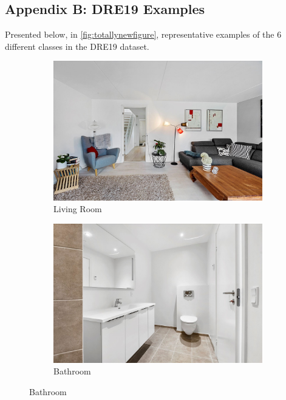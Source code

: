 \subsection*{Appendix B: DRE19 Examples}\label{appendix: B}
Presented below, in \autoref{fig:totallynewfigure}, representative examples of the 6 different classes in the DRE19 dataset.

\begin{figure}[H]
  \centering %
  \begin{subfigure}{0.3\textwidth}
    \includegraphics[width=\linewidth]{pictures/random/example_livingroom}
    \caption{Living Room}
  \end{subfigure}\hfil %
  \begin{subfigure}{0.3\textwidth}
    \includegraphics[width=\linewidth]{pictures/random/example_bathroom}
    \caption{Bathroom}
  \end{subfigure}\hfil %

\end{figure}
